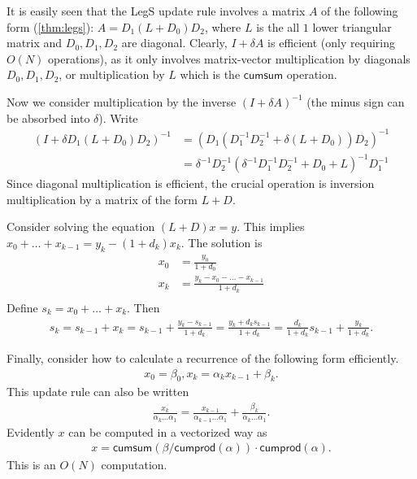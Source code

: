 \documentclass[../hippo.tex]{subfiles}
\begin{document}
It is easily seen that the LegS update rule involves a matrix $A$ of the following form (\cref{thm:legs}):
$A = D_1 (L + D_0) D_2$, where $L$ is the all $1$ lower triangular matrix and $D_0, D_1, D_2$ are diagonal.
Clearly, $I + \delta A$ is efficient (only requiring $O(N)$ operations),
as it only involves matrix-vector multiplication by diagonals $D_0, D_1, D_2$, or multiplication by $L$ which is the $\mathsf{cumsum}$ operation.

Now we consider multiplication by the inverse $(I+\delta A)^{-1}$ (the minus sign can be absorbed into $\delta$).
Write
\begin{align*}
  (I + \delta D_1 (L+D_0) D_2)^{-1}
  &= \left( D_1 (D_1^{-1} D_2^{-1} + \delta (L+D_0)) D_2 \right)^{-1} \\
  &= \delta^{-1} D_2^{-1} \left( \delta^{-1} D_1^{-1} D_2^{-1} + D_0 + L \right)^{-1} D_1^{-1}
\end{align*}
Since diagonal multiplication is efficient,
the crucial operation is inversion multiplication by a matrix of the form $L + D$.

Consider solving the equation $(L + D) x = y$.
This implies $x_0 + \dots + x_{k-1} = y_k - (1+d_k) x_k$.
The solution is
\begin{align*}
  x_0 &= \frac{y_0}{1+d_0} \\
  x_k &= \frac{y_k - x_0 - \dots - x_{k-1}}{1+d_k} \\
\end{align*}
Define $s_k = x_0 + \dots + x_k$.
Then
\begin{align*}
  s_k = s_{k-1} + x_k = s_{k-1} + \frac{y_k - s_{k-1}}{1 + d_k} = \frac{y_k + d_k s_{k-1}}{1 + d_k} = \frac{d_k}{1+d_k}s_{k-1} + \frac{y_k}{1+d_k}.
\end{align*}

Finally, consider how to calculate a recurrence of the following form efficiently.
\begin{align*}
  x_0 = \beta_0, x_k = \alpha_k x_{k-1} + \beta_{k}.
\end{align*}
This update rule can also be written
\begin{align*}
  \frac{x_k}{\alpha_k\dots\alpha_1} = \frac{x_{k-1}}{\alpha_{k-1}\dots\alpha_1} + \frac{\beta_k}{\alpha_k\dots\alpha_1}.
\end{align*}
Evidently $x$ can be computed in a vectorized way as
\begin{align*}
  x = \mathsf{cumsum}(\beta / \mathsf{cumprod}(\alpha)) \cdot \mathsf{cumprod}(\alpha)
  .
\end{align*}
This is an $O(N)$ computation.
\end{document}
